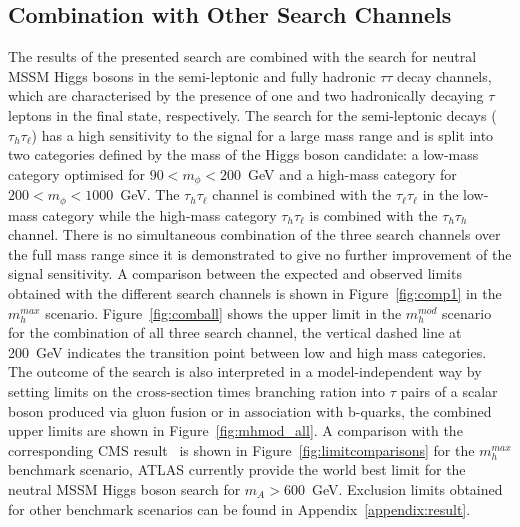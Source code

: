 \subsection{Combination with Other Search Channels}
The results of the presented search are combined with the search for neutral MSSM Higgs bosons in the semi-leptonic 
and fully hadronic $\tau\tau$ decay channels, which are characterised by the presence of one and two hadronically decaying 
$\tau$ leptons in the final state, respectively.
The search for the semi-leptonic decays  ($\tau_h \tau_{\ell}$) has a high sensitivity to the signal for a large mass range
and is split into two categories defined by the mass of the Higgs boson candidate: 
a low-mass category optimised for $90 < m_{\phi} < 200$~GeV and a high-mass category for $200 < m_{\phi} < 1000$~GeV.
The $\tau_h \tau_{\ell}$ channel is combined with the $\tau_{\ell} \tau_{\ell}$ in the low-mass category  while  the high-mass category 
$\tau_h \tau_{\ell}$ is combined with the $\tau_h\tau_h$ channel. There is no simultaneous 
combination of the three search channels over the full mass range since it  is demonstrated to give no further 
improvement of the signal sensitivity. 
A comparison between the expected and observed limits obtained with the different search channels is shown in Figure~\ref{fig:comp1} in the $m_h^{max}$ scenario. 
Figure~\ref{fig:comball} shows the upper limit in the $m_h^{mod}$ scenario for the combination of all three search channel,  the vertical dashed line at 200~GeV 
indicates the transition point between low and high mass categories. 
The outcome of the search is also interpreted in a model-independent way by setting  limits
on the cross-section times branching ration into $\tau$ pairs of a scalar boson produced via
gluon fusion   or in association with b-quarks, the combined upper limits are shown in Figure~\ref{fig:mhmod_all}.
A comparison with the corresponding CMS result~\cite{CMSLimit} is shown in Figure~\ref{fig:limitcomparisons} for the $m_h^{max}$ benchmark scenario,
ATLAS currently provide the world best limit for the neutral MSSM Higgs boson search for  $m_A>600$~GeV.
Exclusion limits obtained for other  benchmark scenarios can be found in Appendix~\ref{appendix:result}.

